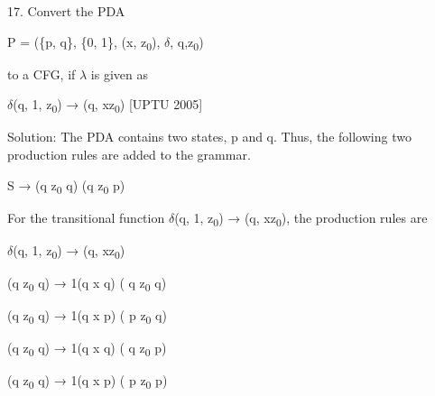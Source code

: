 \documentclass[]{article}
\begin{document}
17. Convert the PDA 

\begin{center}
	P = (\{p, q\}, \{0, 1\}, (x, z\textsubscript{0}), $\delta$, q,z\textsubscript{0})
\end{center}
to a CFG, if $\lambda$ is given as
\begin{center}
			$\delta$(q, 1, z\textsubscript{0}) → (q, xz\textsubscript{0})       [UPTU 2005]
\end{center}

Solution: The PDA contains two states, p and q. Thus, the following two production rules are added to the grammar. 
\begin{center}
	S → (q z\textsubscript{0} q) \textbar{} (q z\textsubscript{0} p)
\end{center}

For the transitional function  $\delta$(q, 1, z\textsubscript{0}) → (q, xz\textsubscript{0}), the production rules are
\begin{center}
	$\delta$(q, 1, z\textsubscript{0}) → (q, xz\textsubscript{0})
\end{center}
\begin{center}
	(q z\textsubscript{0} q) → 1(q x q) ( q z\textsubscript{0} q)
\end{center}
\begin{center}
	(q z\textsubscript{0} q) → 1(q x p) ( p z\textsubscript{0} q)
\end{center}
\begin{center}
	(q z\textsubscript{0} q) → 1(q x q) ( q z\textsubscript{0} p)
\end{center}
\begin{center}
	(q z\textsubscript{0} q) → 1(q x p) ( p z\textsubscript{0} p)
\end{center}
\end{document}
